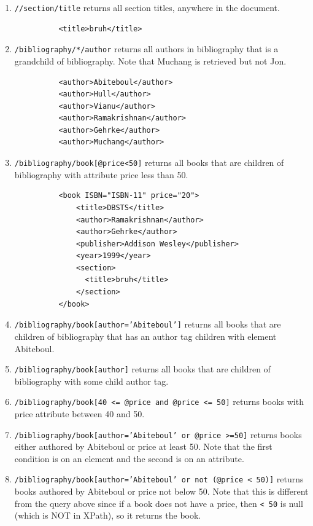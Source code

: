\begin{example}
\begin{enumerate}
      \item \texttt{//section/title} returns all section titles, anywhere in the document.
        \begin{lstlisting}
          <title>bruh</title>
        \end{lstlisting}

      \item \texttt{/bibliography/*/author} returns all authors in bibliography that is a grandchild of bibliography. Note that Muchang is retrieved but not Jon. 
        \begin{lstlisting}
          <author>Abiteboul</author>
          <author>Hull</author>
          <author>Vianu</author>
          <author>Ramakrishnan</author>
          <author>Gehrke</author>
          <author>Muchang</author>
        \end{lstlisting}

      \item \texttt{/bibliography/book[@price<50]} returns all books that are children of bibliography with attribute price less than 50. 
        \begin{lstlisting}
          <book ISBN="ISBN-11" price="20">
              <title>DBSTS</title>
              <author>Ramakrishnan</author>
              <author>Gehrke</author>
              <publisher>Addison Wesley</publisher>
              <year>1999</year>
              <section>
                <title>bruh</title>
              </section>
          </book>
        \end{lstlisting}

      \item \texttt{/bibliography/book[author='Abiteboul']} returns all books that are children of bibliography that has an author tag children with element Abiteboul. 

      \item \texttt{/bibliography/book[author]} returns all books that are children of bibliography with some child author tag. 

      \item \texttt{/bibliography/book[40 <= @price and @price <= 50]} returns books with price attribute between 40 and 50. 

      \item \texttt{/bibliography/book[author='Abiteboul' or @price >=50]} returns books either authored by Abiteboul or price at least 50. Note that the first condition is on an element and the second is on an attribute. 

      \item \texttt{/bibliography/book[author='Abiteboul' or not (@price < 50)]} returns books authored by Abiteboul or price not below 50. Note that this is different from the query above since if a book does not have a price, then \texttt{\@price < 50} is null (which is NOT in XPath), so it returns the book. 
    \end{enumerate}
  \end{example}

